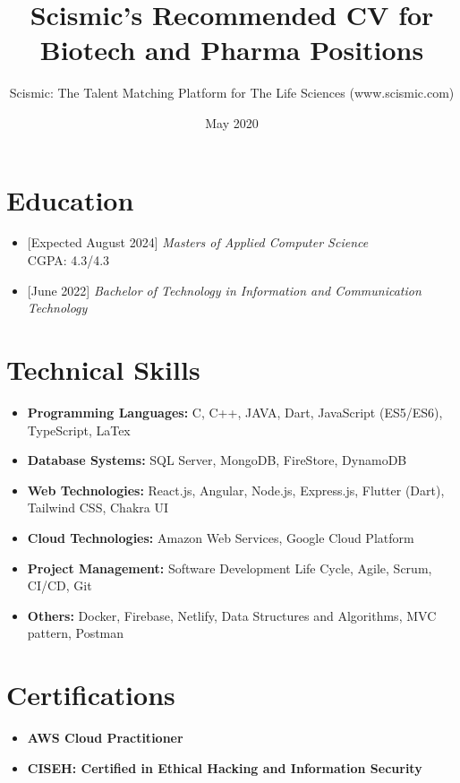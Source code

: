 \documentclass{article}
\title{Scismic's Recommended CV for Biotech and Pharma Positions}
\author{Scismic: The Talent Matching Platform for The Life Sciences (www.scismic.com)}
\date{May 2020}
\begin{document}

\makecvtitle %

\section{Education}
\begin{itemize}

\item
{}[Expected August 2024]
\textit{Masters of Applied Computer Science}
\\
CGPA: 4.3/4.3
\item
{}[June 2022]
\textit{Bachelor of Technology in Information and Communication Technology}


\end{itemize}
 
\section{Technical Skills}

\begin{itemize}
\item \textbf{Programming Languages:} C, C++, JAVA, Dart, JavaScript (ES5/ES6), TypeScript, LaTex
\item \textbf{Database Systems:} SQL Server, MongoDB, FireStore, DynamoDB
\item \textbf{Web Technologies:} React.js, Angular, Node.js, Express.js, Flutter (Dart), Tailwind CSS, Chakra UI
\item \textbf{Cloud Technologies:} Amazon Web Services, Google Cloud Platform
\item \textbf{Project Management:} Software Development Life Cycle, Agile, Scrum, CI/CD, Git  
\item \textbf{Others:} Docker, Firebase, Netlify, Data Structures and Algorithms, MVC pattern, Postman

\end{itemize}

\section{Certifications}
\begin{itemize}
\item \textbf{AWS Cloud Practitioner}
\item \textbf{CISEH: Certified in Ethical Hacking and Information Security}
\end{itemize}
\end{document}
